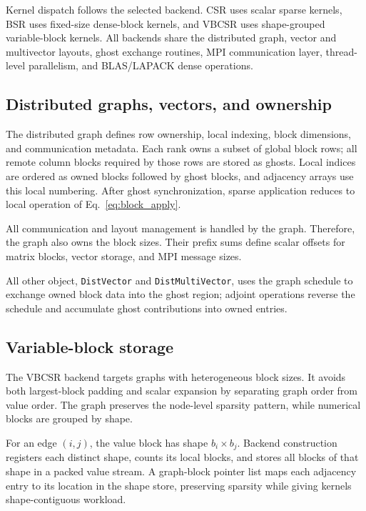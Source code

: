 \documentclass[
reprint,
superscriptaddress,
frontmatterverbose,
amsmath,amssymb,
pra,
]{revtex4-2}
\begin{document}
Kernel dispatch follows the selected backend.  CSR uses scalar sparse kernels,
BSR uses fixed-size dense-block kernels, and VBCSR uses shape-grouped
variable-block kernels.  All backends share the distributed graph, vector and
multivector layouts, ghost exchange routines, MPI communication layer,
thread-level parallelism, and BLAS/LAPACK dense operations.

\subsection{Distributed graphs, vectors, and ownership}

The distributed graph defines row ownership, local indexing, block dimensions,
and communication metadata.  Each rank owns a subset of global block rows; all
remote column blocks required by those rows are stored as ghosts.  Local indices
are ordered as owned blocks followed by ghost blocks, and adjacency arrays use
this local numbering.  After ghost synchronization, sparse application reduces
to local operation of Eq.~\eqref{eq:block_apply}.

All communication and layout management is handled by the graph.  Therefore, the graph also owns the block sizes.  Their prefix sums define scalar offsets for
matrix blocks, vector storage, and MPI message sizes.

All other object, \texttt{DistVector} and \texttt{DistMultiVector}, uses the graph schedule to exchange owned block data into the ghost region; adjoint operations reverse the schedule and accumulate ghost contributions into owned entries.

\subsection{Variable-block storage}

The VBCSR backend targets graphs with heterogeneous block sizes.  It avoids both
largest-block padding and scalar expansion by separating graph order from value
order.  The graph preserves the node-level sparsity pattern, while numerical
blocks are grouped by shape.

For an edge $(i,j)$, the value block has shape $b_i \times b_j$.  Backend
construction registers each distinct shape, counts its local blocks, and stores
all blocks of that shape in a packed value stream.  A graph-block pointer list maps
each adjacency entry to its location in the shape store, preserving sparsity while giving kernels shape-contiguous workload.
\end{document}
